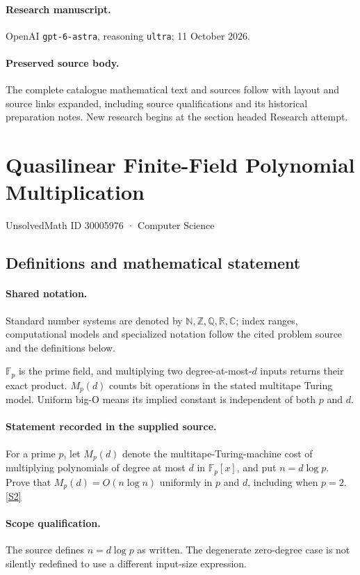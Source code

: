 \documentclass[11pt]{article}
\begin{document}
\paragraph{Research manuscript.} OpenAI \texttt{gpt-6-astra}, reasoning \texttt{ultra}; 11 October 2026.
\paragraph{Preserved source body.} The complete catalogue mathematical text and sources follow with layout and source links expanded, including source qualifications and its historical preparation notes. New research begins at the section headed Research attempt.

\section{Quasilinear Finite-Field Polynomial Multiplication}\label{30005976}
{\small UnsolvedMath ID 30005976 · Computer Science}
\subsection{Definitions and mathematical statement}

\paragraph{Shared notation.}Standard number systems are denoted by $\mathbb N,\mathbb Z,\mathbb Q,\mathbb R,\mathbb C$; index ranges, computational models and specialized notation follow the cited problem source and the definitions below.


$\mathbb F_p$ is the prime field, and multiplying two degree-at-most-$d$ inputs returns their exact product. $M_p(d)$ counts bit operations in the stated multitape Turing model. Uniform big-O means its implied constant is independent of both $p$ and $d$.
\paragraph{Statement recorded in the supplied source.}
For a prime $p$, let $M_p(d)$ denote the multitape-Turing-machine cost of multiplying polynomials of degree at most $d$ in $\mathbb{F}_p[x]$, and put $n=d\log p$. Prove that $M_p(d)=O(n\log n)$ uniformly in $p$ and $d$, including when $p=2$. \href{https://doi.org/10.4171/owr/2024/40}{[S2]}
\paragraph{Scope qualification.}
The source defines $n=d\log p$ as written. The degenerate zero-degree case is not silently redefined to use a different input-size expression.
\end{document}
